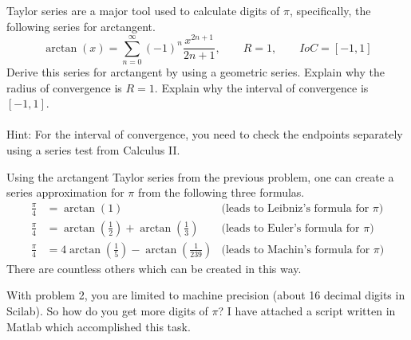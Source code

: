 \documentclass[addpoints, 11pt]{exam}
\begin{document}
\begin{questions}

\question Taylor series are a major tool used to calculate digits of $\pi$, specifically, the following series for arctangent.
\[
\arctan(x) = \sum_{n=0}^{\infty} (-1)^n\frac{x^{2n+1}}{2n+1}, \quad\quad R=1, \quad\quad IoC = [-1,1]
\]
Derive this series for arctangent by using a geometric series. Explain why the radius of convergence is $R=1$. Explain why the interval of convergence is $[-1,1]$. \\ \ \\
Hint: For the interval of convergence, you need to check the endpoints separately using a series test from Calculus II.

\pagebreak


\question Using the arctangent Taylor series from the previous problem, one can create a series approximation for $\pi$ from the following three formulas.
\begin{align}
\frac{\pi}{4} &= \arctan(1) &\text{(leads to Leibniz's formula for $\pi$)}\\
\frac{\pi}{4} &= \arctan\left(\frac{1}{2}\right) + \arctan\left(\frac{1}{3}\right) &\text{(leads to Euler's formula for $\pi$)}\\
\frac{\pi}{4} &= 4\arctan\left(\frac{1}{5}\right) - \arctan\left(\frac{1}{239}\right) &\text{(leads to Machin's formula for $\pi$)}
\end{align}
There are countless others which can be created in this way. 


\question With problem 2, you are limited to machine precision (about 16 decimal digits in Scilab). So how do you get more digits of $\pi$? I have attached a script written in Matlab which accomplished this task.
\begin{parts}

\end{parts}
\end{questions}
\end{document}
